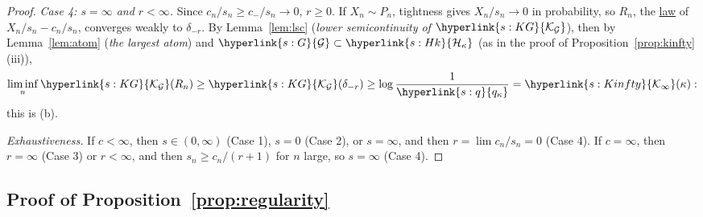 \documentclass[11pt]{article}
\newcommand{\sy}[2]{{\hyperlink{#1}{#2}}}
\newcommand{\term}[2]{\hyperlink{#1}{#2}}
\newcommand{\Hk}{\sy{s:Hk}{\mathcal{H}_{\kappa}}}
\newcommand{\Gk}{\sy{s:G}{\mathcal{G}}}
\newcommand{\KG}{\sy{s:KG}{\mathcal{K}_{\mathcal{G}}}}
\newcommand{\qk}{\sy{s:q}{q_{\kappa}}}
\newcommand{\Kinfty}{\sy{s:Kinfty}{\mathcal{K}_{\infty}}}
\begin{document}
\begin{proof}
\emph{Case 4: $s=\infty$ and $r<\infty$.} Since $c_n/s_n\ge c_-/s_n\to0$, $r\ge0$. If $X_n\sim P_n$, tightness gives
$X_n/s_n\to0$ in probability, so $R_n$, the \term{w:law}{law} of $X_n/s_n-c_n/s_n$, converges weakly to $\delta_{-r}$. By
Lemma~\ref{lem:lsc} (\emph{lower semicontinuity of $\KG$}), then by Lemma~\ref{lem:atom} (\emph{the largest atom}) and $\Gk\subset\Hk$ (as in the proof of
Proposition~\ref{prop:kinfty}(iii)),
\begin{equation*}
  \liminf_n\KG(R_n)\ge\KG(\delta_{-r})\ge\log\frac1{\qk}=\Kinfty(\kappa):
\end{equation*}
this is (b).

\emph{Exhaustiveness.} If $c<\infty$, then $s\in(0,\infty)$ (Case 1), $s=0$ (Case 2), or $s=\infty$, and then
$r=\lim c_n/s_n=0$ (Case 4). If $c=\infty$, then $r=\infty$ (Case 3) or $r<\infty$, and then $s_n\ge c_n/(r+1)$ for $n$
large, so $s=\infty$ (Case 4).
\end{proof}

\subsection{Proof of Proposition~\ref{prop:regularity}}\label{sec:proof-prop-regularity}
\end{document}
